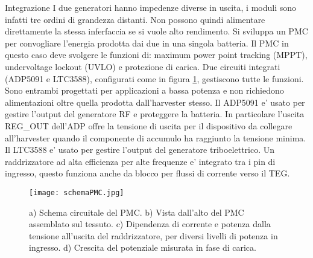 \begin{section}{Integrazione}
    I due generatori hanno impedenze diverse in uscita, i moduli sono infatti tre ordini di grandezza distanti. Non possono quindi alimentare direttamente la stessa inferfaccia se si vuole alto rendimento. Si sviluppa un PMC per convogliare l'energia prodotta dai due in una singola batteria. Il PMC in questo caso deve svolgere le funzioni di: maximum power point tracking (MPPT), undervoltage lockout (UVLO) e protezione di carica. Due circuiti integrati (ADP5091 e LTC3588), configurati come in figura \ref{fig:schemaPMC}, gestiscono tutte le funzioni. Sono entrambi progettati per applicazioni a bassa potenza e non richiedono alimentazioni oltre quella prodotta dall'harvester stesso. Il ADP5091 e' usato per gestire l'output del generatore RF e proteggere la batteria. In particolare l'uscita REG\_OUT dell'ADP offre la tensione di uscita per il dispositivo da collegare all'harvester quando il componente di accumulo ha raggiunto la tensione minima. Il LTC3588 e' usato per gestire l'output del generatore triboelettrico. Un raddrizzatore ad alta efficienza per alte frequenze e' integrato  tra i pin di ingresso, questo funziona anche da blocco per flussi di corrente verso il TEG.

    \begin{figure}[hbt!]
        \texttt{[image: schemaPMC.jpg]}
        \centering
        \caption{a) Schema circuitale del PMC. b) Vista dall'alto del PMC assemblato sul tessuto. c) Dipendenza di corrente e potenza dalla tensione all'uscita del raddrizzatore, per diversi livelli di potenza in ingresso. d) Crescita del potenziale misurata in fase di carica.\cite{kouWearableAllFabricHybrid2024}}
        \label{fig:schemaPMC}
    \end{figure}


\end{section}
